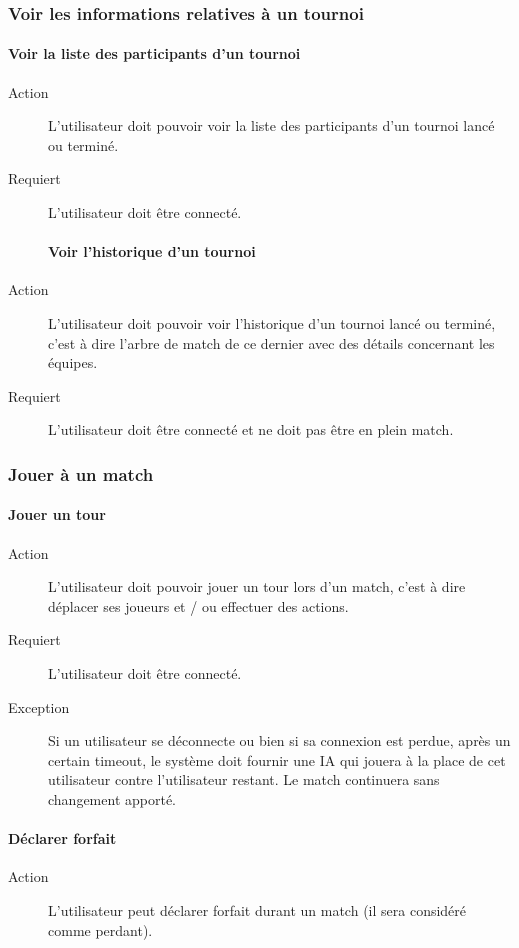 \documentclass[a4paper]{article}
\begin{document}
\subsubsection{Voir les informations relatives à un tournoi}
\paragraph{Voir la liste des participants d'un tournoi}
\begin{description}
\item[Action] L'\gls{utilisateur} doit pouvoir voir la liste des participants d'un tournoi lancé ou terminé.
\item[Requiert] L'\gls{utilisateur} doit être connecté.
\paragraph{Voir l'historique d'un tournoi}
\item[Action] L'\gls{utilisateur} doit pouvoir voir l'historique d'un tournoi lancé ou terminé, c'est à dire l'arbre de match de ce dernier avec des détails concernant les équipes.
\item[Requiert] L'\gls{utilisateur} doit être connecté et ne doit pas être en plein match.
\end{description}

\subsubsection{Jouer à un match}
\paragraph{Jouer un tour}
\begin{description}
\item[Action] L'\gls{utilisateur} doit pouvoir jouer un tour lors d'un match, c'est à dire déplacer ses joueurs et / ou effectuer des actions.
\item[Requiert] L'utilisateur doit être connecté.
\item[Exception] Si un \gls{utilisateur} se déconnecte ou bien si sa connexion est perdue, après un certain timeout, le système doit fournir une IA qui jouera à la place de cet \gls{utilisateur} contre l'\gls{utilisateur} restant. Le match continuera sans changement apporté.
\end{description}
\paragraph{Déclarer forfait}
\begin{description}
\item[Action] L'\gls{utilisateur} peut déclarer forfait durant un match (il sera considéré comme perdant).
\end{description}
\end{document}
